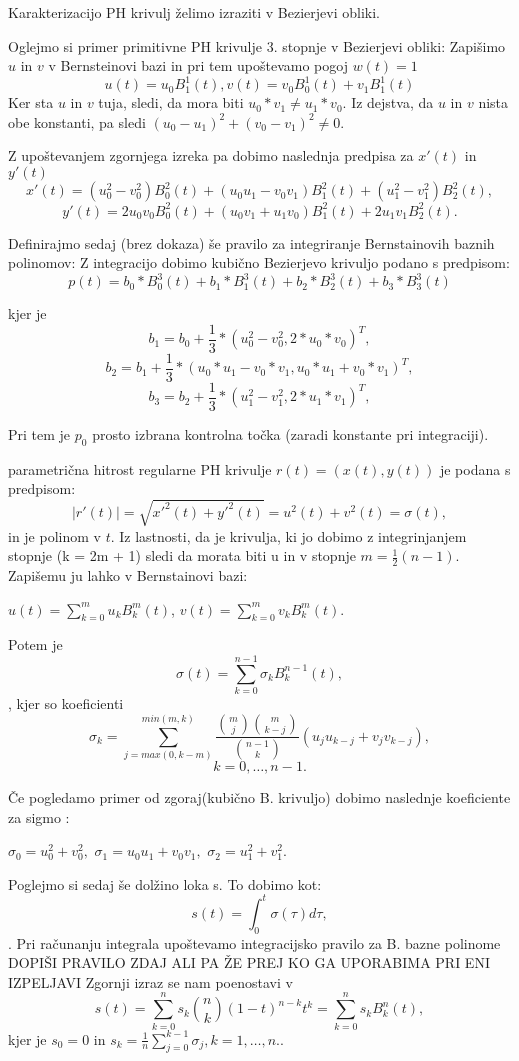 \documentclass[12pt]{article}
\begin{document}
Karakterizacijo PH krivulj želimo izraziti v Bezierjevi obliki.

Oglejmo si primer primitivne PH krivulje 3. stopnje v Bezierjevi obliki:
Zapišimo $u$ in $v$ v Bernsteinovi bazi in pri tem upoštevamo pogoj $w(t) = 1$
$$u(t) = u_0 B^1_1(t), v(t) = v_0 B^1_0(t) + v_1 B^1_1(t)$$
Ker sta $u$ in $v$ tuja, sledi, da mora biti $u_0*v_1 \neq u_1*v_0$. Iz dejstva, da
$u$ in $v$ nista obe konstanti, pa sledi $(u_0 - u_1)^2 + (v_0 - v_1)^2 \neq 0$.

Z upoštevanjem zgornjega izreka pa dobimo naslednja predpisa za $x'(t)$ in $y'(t)$
$$x'(t) = (u_0^2 - v_0^2) B_0^2(t) + (u_0 u_1 - v_0 v_1) B_1^2(t) + (u_1^2 - v_1^2) B_2^2(t),$$
$$y'(t) = 2 u_0 v_0 B_0^2(t) + (u_0 v_1 + u_1 v_0) B_1^2(t) + 2 u_1 v_1 B_2^2(t).$$

Definirajmo sedaj (brez dokaza) še pravilo za integriranje Bernstainovih baznih polinomov:
Z integracijo dobimo kubično Bezierjevo krivuljo podano s predpisom:
$$p(t) = b_0*B_0^3(t) + b_1*B_1^3(t) + b_2*B_2^3(t) + b_3*B_3^3(t)$$

kjer je
$$b_1 = b_0 + \frac{1}{3}*(u_0^2 - v_0^2, 2*u_0*v_0)^T,$$
$$b_2 = b_1 + \frac{1}{3}*(u_0*u_1 - v_0*v_1, u_0*u_1 + v_0*v_1)^T,$$
$$b_3 = b_2 + \frac{1}{3}*(u_1^2 - v_1^2, 2*u_1*v_1)^T,$$

Pri tem je $p_0$ prosto izbrana kontrolna točka (zaradi konstante pri integraciji).

parametrična hitrost regularne PH krivulje $r(t) = (x(t), y(t))$ je podana s predpisom:
$$ | r\prime (t) | =\sqrt{x\prime^2(t)+y\prime^2(t)}= u^2 (t) + v^2 (t) = \sigma (t),$$
in je polinom v $t$. 
Iz lastnosti, da je krivulja, ki jo dobimo z integrinjanjem stopnje (k = 2m + 1) sledi
da morata biti u in v stopnje  $m = \frac{1}{2}(n - 1)$. Zapišemu ju lahko v 
Bernstainovi bazi:

	$u (t)=\sum_{k=0}^m u_kB_k^m(t)$, 
	$v (t) =\sum_{k=0}^m v_kB_k^m(t).$

Potem je 
$$\sigma (t) =\sum_{k=0}^{n-1} \sigma_kB_k^{n-1}(t),$$, 
kjer so koeficienti 
$$\sigma_k =\sum_{j=max(0,k-m)}^{min(m,k)}\frac{\binom{m}{j}\binom{m}{k-j}}{\binom{n-1}{k}}(u_ju_{k-j}+v_jv_{k-j}),$$ $$k = 0,\ldots , n - 1.$$

Če pogledamo primer od zgoraj(kubično B. krivuljo) dobimo naslednje koeficiente za sigmo :

$\sigma_0 = u^2_0+ v^2_0, $
$\sigma_1 = u_0u_1 + v_0v_1,$ 
$\sigma_2 = u^2_1+ v^2_1.$

Poglejmo si sedaj še dolžino loka s.
To dobimo kot:
$$s (t) =\int^t_0\sigma(\tau) d\tau,$$.
Pri računanju integrala upoštevamo integracijsko pravilo za B. bazne polinome 
DOPIŠI PRAVILO ZDAJ ALI PA ŽE PREJ KO GA UPORABIMA PRI ENI IZPELJAVI
Zgornji izraz se nam poenostavi v 
$$s (t) =\sum^n_{k=0}s_k\binom{n}{k}(1-t)^{n-k}t^k=\sum_{k=0}^n s_kB^n_k(t),$$
	kjer je $s_0=0$ in $s_k=\frac{1}{n}\sum^{k-1}_{j=0}\sigma_j, k=1,\ldots,n.$.
\end{document}
